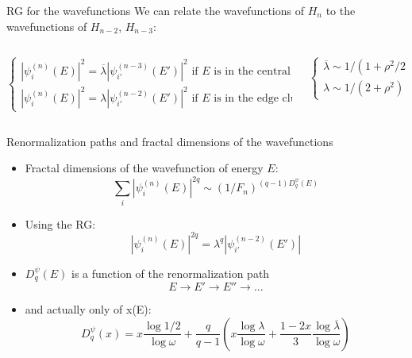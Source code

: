 \documentclass[xcolor=x11names,compress,professionalfonts]{beamer}
\renewcommand{\(}{\begin{columns}}
\renewcommand{\)}{\end{columns}}
\newcommand{\<}[1]{\begin{column}{#1}}
\renewcommand{\>}{\end{column}}
\newcommand{\lb}{\ensuremath{\overline{\lambda}}}
\begin{document}
\begin{frame}{RG for the wavefunctions}
We can relate the wavefunctions of $H_n$ to the wavefunctions of $H_{n-2}$, $H_{n-3}$:
	
	\centering
	
	
\begin{columns}
	\begin{column}{9cm}
	\[
	\begin{cases}
		|\psi_i^{(n)}(E)|^2 = \lb |\psi_{i'}^{(n-3)}(E')|^2 \text{~if $E$ is in the central cluster}\\
		|\psi_i^{(n)}(E)|^2 = \lambda |\psi_{i'}^{(n-2)}(E')|^2 \text{~if }E\text{~is in the edge clusters}
	\end{cases}
	\]
	\end{column}
	\begin{column}{3cm}
	\[
	\begin{cases}
		\lb \sim  1/(1+\rho^2/2) \\
		\lambda \sim 1/(2+\rho^2)
	\end{cases}
	\]
	\end{column}
\end{columns}
\end{frame}

\begin{frame}{Renormalization paths and fractal dimensions of the wavefunctions}
\begin{itemize}
	\item Fractal dimensions of the wavefunction of energy $E$:
	\[ \sum_i |\psi_i^{(n)}(E)|^{2q} \sim (1/F_n)^{(q-1)D_q^\psi(E)}  \]
	\item Using the RG:
		\[ |\psi_i^{(n)}(E)|^{2q} = \lambda^q |\psi_{i'}^{(n-2)}(E')| \]
	\item $D_q^\psi(E)$ is a function of the renormalization path
	\[ E \rightarrow E' \rightarrow E'' \rightarrow ... \]
	\item and actually only of x(E):
	\[ D_q^\psi(x) = x \frac{\log 1/2}{\log \omega} + \frac{q}{q-1} \left( x \frac{\log \lambda}{\log \omega} + \frac{1-2x}{3}\frac{\log \lb}{\log \omega} \right) \]
\end{itemize}
\end{frame}
\end{document}
